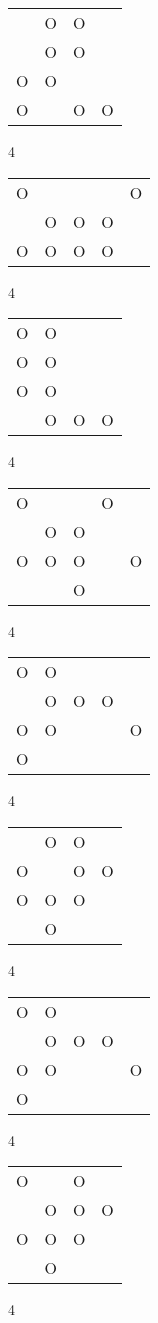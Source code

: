 \begin{tabular}{|m{0.2cm}m{0.2cm}m{0.2cm}m{0.2cm}|}\hline
 &O&O& \\
 &O&O& \\
O&O& & \\
O& &O&O\\
\hline\end{tabular}4
\begin{tabular}{|m{0.2cm}m{0.2cm}m{0.2cm}m{0.2cm}m{0.2cm}|}\hline
O& & & &O\\
 &O&O&O& \\
O&O&O&O& \\
\hline\end{tabular}4
\begin{tabular}{|m{0.2cm}m{0.2cm}m{0.2cm}m{0.2cm}|}\hline
O&O& & \\
O&O& & \\
O&O& & \\
 &O&O&O\\
\hline\end{tabular}4
\begin{tabular}{|m{0.2cm}m{0.2cm}m{0.2cm}m{0.2cm}m{0.2cm}|}\hline
O& & &O& \\
 &O&O& & \\
O&O&O& &O\\
 & &O& & \\
\hline\end{tabular}4
\begin{tabular}{|m{0.2cm}m{0.2cm}m{0.2cm}m{0.2cm}m{0.2cm}|}\hline
O&O& & & \\
 &O&O&O& \\
O&O& & &O\\
O& & & & \\
\hline\end{tabular}4
\begin{tabular}{|m{0.2cm}m{0.2cm}m{0.2cm}m{0.2cm}|}\hline
 &O&O& \\
O& &O&O\\
O&O&O& \\
 &O& & \\
\hline\end{tabular}4
\begin{tabular}{|m{0.2cm}m{0.2cm}m{0.2cm}m{0.2cm}m{0.2cm}|}\hline
O&O& & & \\
 &O&O&O& \\
O&O& & &O\\
O& & & & \\
\hline\end{tabular}4
\begin{tabular}{|m{0.2cm}m{0.2cm}m{0.2cm}m{0.2cm}|}\hline
O& &O& \\
 &O&O&O\\
O&O&O& \\
 &O& & \\
\hline\end{tabular}4
